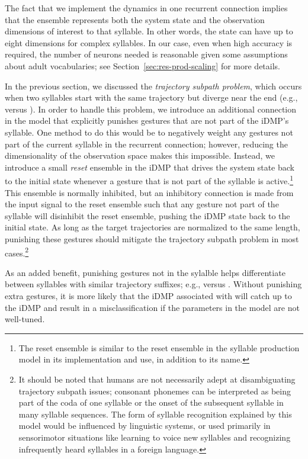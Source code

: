 The fact that we implement the dynamics
in one recurrent connection
implies that the ensemble
represents both the system state
and the observation dimensions
of interest to that syllable.
In other words, the state can have
up to eight dimensions for complex syllables.
In our case,
even when high accuracy is required,
the number of neurons needed
is reasonable given some assumptions
about adult vocabularies;
see Section~\ref{sec:res-prod-scaling}
for more details.

In the previous section, we discussed
the \textit{trajectory subpath problem},
which occurs when two syllables
start with the same trajectory
but diverge near the end
(e.g., \ipa{[bA]} versus \ipa{[bAr]}).
In order to handle this problem,
we introduce an additional connection
in the model that explicitly punishes
gestures that are not
part of the iDMP's syllable.
One method to do this would be to
negatively weight any gestures
not part of the current syllable
in the recurrent connection;
however, reducing the dimensionality
of the observation space makes
this impossible.
Instead, we introduce a small \textit{reset} ensemble
in the iDMP that drives
the system state back to the initial state
whenever a gesture that is not part
of the syllable is active.\footnote{
  The reset ensemble is similar to the reset ensemble
  in the syllable production model
  in its implementation and use,
  in addition to its name.}
This ensemble is normally inhibited,
but an inhibitory connection is made
from the input signal to the reset ensemble
such that any gesture
not part of the syllable will
disinhibit the reset ensemble,
pushing the iDMP state back to the initial state.
As long as the target trajectories
are normalized to the same length,
punishing these gestures should
mitigate the trajectory subpath problem
in most cases.\footnote{
  It should be noted that humans
  are not necessarily adept at
  disambiguating trajectory subpath issues;
  consonant phonemes can be interpreted
  as being part of the coda of one syllable
  or the onset of the subsequent syllable
  in many syllable sequences.
  The form of syllable recognition
  explained by this model would
  be influenced by linguistic systems,
  or used primarily in sensorimotor situations
  like learning to voice new syllables
  and recognizing infrequently heard syllables
  in a foreign language.}

As an added benefit,
punishing gestures not in the sylalble helps
differentiate between syllables with
similar trajectory suffixes;
e.g., \ipa{[bAr]} versus \ipa{[dAr]}.
Without punishing extra gestures,
it is more likely that the iDMP
associated with \ipa{[dAr]} will catch up
to the \ipa{[bAr]} iDMP
and result in a misclassification
if the parameters in the model
are not well-tuned.

